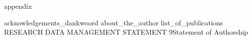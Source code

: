 
 {appendix}
\printglossary[nonumberlist]
\printglossary[type=\acronymtype,nonumberlist]




%

\ifdraft
   
\else
	{acknowledgements_dankwoord}
    {about_the_author}
    {list_of_publications}
    {RESEARCH DATA MANAGEMENT STATEMENT}
    {9Statement of Authorship}
\fi

\ifprintcover
    \cleardoublepage
    \thispagestyle{empty}
    
\fi